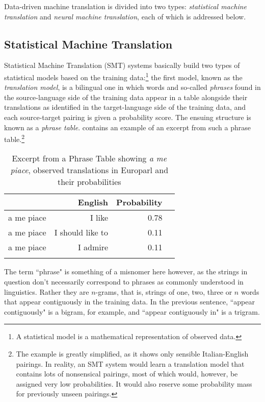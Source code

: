 \documentclass[output=paper]{langscibook}
\begin{document}
Data-driven machine translation is  divided into two types: \textit{statistical machine translation} and \textit{neural machine translation}, each of which is addressed below. 

\subsection{Statistical Machine Translation}
Statistical Machine Translation (SMT) systems basically build two types of statistical models based on the training data:\footnote{A statistical model is a mathematical representation of observed data.} the first model, known as the \textit{translation model}, is a bilingual one in which words and so-called \textit{phrases} found in the source-language side of the training data appear in a table alongside their translations as identified in the target-language side of the training data, and each source-target pairing is given a probability score. The ensuing structure is known as a \textit{phrase table}.  contains an example of an excerpt from such a phrase table.\footnote{The example is greatly simplified, as it shows only sensible Italian-English pairings. In reality, an SMT system would learn a translation model that contains lots of nonsensical pairings, most of which would, however, be assigned very low probabilities. It would also reserve some probability mass for previously unseen pairings.}

\begin{table}
\caption{Excerpt from a Phrase Table showing \textit{a me piace}, observed translations in Europarl and their probabilities}
\label{tab:1:n-grams}
 \begin{tabular}{l rrc}
  \lsptoprule
            & English & Probability\\
  \midrule
  a me piace  &   I like  &    0.78\\
  a me piace  &   I should like to  &    0.11\\
  a me piace  &   I admire  &    0.11\\
  \lspbottomrule
 \end{tabular}
\end{table}

The term “phrase" is something of a misnomer here however, as the strings in question don't necessarily correspond to phrases as commonly understood in linguistics. Rather they are $n$-grams, that is, strings of one, two, three or $n$ words that appear contiguously in the training data. In the previous sentence, “appear contiguously" is a bigram, for example, and “appear contiguously in" is a trigram.
\end{document}
